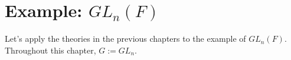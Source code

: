 %	
%	
%	
%	
%	
%




\chapter{Example: $GL_n(F)$}

Let's apply the theories in the previous chapters to the example of $GL_n(F)$. Throughout this chapter, $G:=GL_n$.

